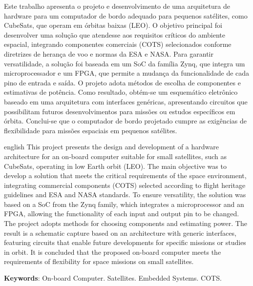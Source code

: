 \documentclass[
12pt,				%
oneside,			%
a4paper,			%
chapter=TITLE,		%
section=TITLE,		%
english,			%
brazil				%
hyperref=hidelinks]{abntex2}
\begin{document}
\begin{resumo}
Este trabalho apresenta o projeto e desenvolvimento de uma arquitetura de hardware para um computador de bordo adequado para pequenos satélites, como CubeSats, que operam em órbitas baixas (LEO). O objetivo principal foi desenvolver uma solução que atendesse aos requisitos críticos do ambiente espacial, integrando componentes comerciais (COTS) selecionados conforme diretrizes de herança de voo e normas da ESA e NASA. Para garantir versatilidade, a solução foi baseada em um SoC da família Zynq, que integra um microprocessador e um FPGA, que permite a mudança da funcionalidade de cada pino de entrada e saída. O projeto adota métodos de escolha de componentes e estimativas de potência. Como resultado, obtém-se um esquemático eletrônico baseado em uma arquitetura com interfaces genéricas, apresentando circuitos que possibilitam futuros desenvolvimentos para missões ou estudos específicos em órbita. Conclui-se que o computador de bordo projetado cumpre as exigências de flexibilidade para missões espaciais em pequenos satélites.

\end{resumo}

\begin{resumo}[Abstract]
\begin{otherlanguage*}{english}
This project presents the design and development of a hardware architecture for an on-board computer suitable for small satellites, such as CubeSats, operating in low Earth orbit (LEO). The main objective was to develop a solution that meets the critical requirements of the space environment, integrating commercial components (COTS) selected according to flight heritage guidelines and ESA and NASA standards. To ensure versatility, the solution was based on a SoC from the Zynq family, which integrates a microprocessor and an FPGA, allowing the functionality of each input and output pin to be changed. The project adopts methods for choosing components and estimating power. The result is a schematic capture based on an architecture with generic interfaces, featuring circuits that enable future developments for specific missions or studies in orbit. It is concluded that the proposed on-board computer meets the requirements of flexibility for space missions on small satellites.
\vspace{\onelineskip}
\noindent 

\textbf{Keywords}: On-board Computer. Satellites. Embedded Systems. COTS.
 \end{otherlanguage*}
\end{resumo}
\end{document}

